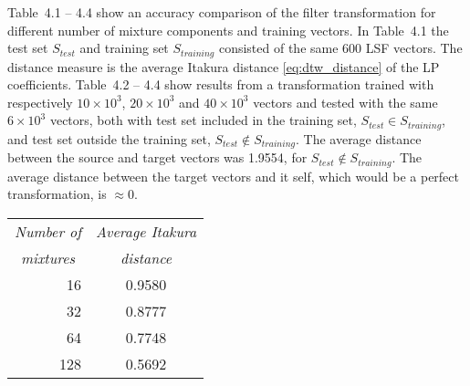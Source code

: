 \clearpage
Table~4.1 -- 4.4 show an accuracy comparison of the filter transformation for different number of mixture components and training vectors. In Table~4.1 the test set $S_{test}$ and training set $S_{training}$ consisted of the same 600 LSF vectors. The distance measure is the average Itakura distance \eqref{eq:dtw_distance} of the LP coefficients. Table~4.2 -- 4.4 show results from a transformation trained with respectively $10\times 10^3$, $20\times 10^3$ and $40\times 10^3$ vectors and tested with the same $6\times 10^3$ vectors, both with test set included in the training set, $S_{test} \in S_{training}$, and test set outside the training set, $S_{test} \notin S_{training}$. The average distance between the source and target vectors was 1.9554, for $S_{test} \notin S_{training}$. The average distance between the target vectors and it self, which would be a perfect transformation, is $\approx 0$.

\begin{table}[htbp]
	\begin{center}
		\begin{tabular}{r|c}
			\toprule
			\multicolumn{1}{c}{\emph{Number of}} & \multicolumn{1}{c}{\emph{Average Itakura}} \\
\multicolumn{1}{c}{\emph{mixtures}} &  \multicolumn{1}{c}{\emph{distance}} \\
			\midrule
			16 & 0.9580 \\
			32 & 0.8777 \\
			64 & 0.7748 \\
			128 & 0.5692 \\
			\bottomrule			
		\end{tabular}		
	\end{center}
	\label{tab:accuracy_comparison_equal}	
\end{table}


